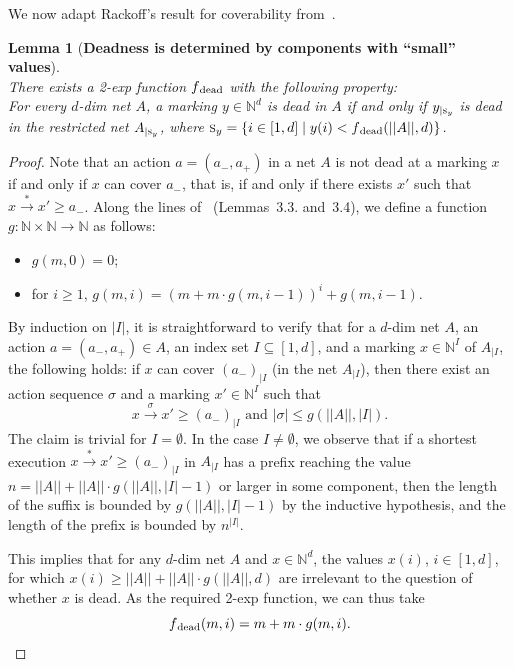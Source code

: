 \documentclass[11pt,a4paper]{amsart}
\newcommand{\step}[1]{\mathrel{\xrightarrow{#1}}}
\newcommand{\reach}{\step{*}}
\newcommand{\nnorm}[1]{||#1||}
\newcommand{\dead}{{}_\textnormal{dead}}
\newcommand{\Nat}{\mathbb{N}}
\newcommand{\restr}[1]{_{|{#1}}}
\newcommand{\setN}{\Nat}
\let\origtextsc\textsc
\renewcommand{\textsc}[1]{\textnormal{\origtextsc{#1}}}
\theoremstyle{plain}
\newtheorem{lem}[thm]{Lemma}
\theoremstyle{definition}
\theoremstyle{defC}
\theoremstyle{thmC}
\begin{document}
\noindent
We now adapt Rackoff's result for coverability
from~\cite{DBLP:journals/tcs/Rackoff78}.
\begin{lem}[\textbf{Deadness is determined by components with
	``small'' values}]\label{lem:rackoffdead}
\hfill\\
	There exists a 2-exp function $f\dead$ with the following property:
\\
For every
$d$-dim net $A$, a marking $y\in\setN^d$ is dead in $A$ if and only if 
 $y\restr{\textsc{s}_y}$ is dead in the restricted net
	$A\restr{\textsc{s}_y}$,
	where $\textsc{s}_y=\{i\in [1,d]\mid
y(i)<f\dead(\nnorm{A},d)\}$.
\end{lem}
\begin{proof}
Note that an action $a=(a_-,a_+)$ in a net $A$
	is not dead
	at a marking $x$ if and only if $x$ can cover $a_-$, that is, 
	if and only if there exists $x'$ such that $x\reach x'\geq a_-$.
	Along the lines of~\cite{DBLP:journals/tcs/Rackoff78}
	(Lemmas~3.3. and~3.4), we define a function
	$g:\setN\times\setN\to\setN$ as follows:
\begin{itemize}
	\item			
 $g(m,0)=0$;
\item
	for $i\geq 1$,	$g(m,i)= (m + m\cdot g(m,i{-}1))^{i}+g(m,i{-}1)$.
\end{itemize}		

	\noindent
	By induction on $|I|$, it is straightforward to verify that 
	for a $d$-dim net $A$, 
an action $a=(a_-,a_+)\in A$, an index set $I\subseteq [1,d]$, and a
	marking
	$x\in\setN^I$ of $A\restr{I}$, the following holds: if  $x$ can cover
	$(a_-)\restr{I}$ (in the net $A\restr{I}$), then 
there exist an action sequence $\sigma$ and a marking $x'\in\setN^I$ such that 
	\begin{equation*}
		x\step{\sigma}x'\geq (a_-)\restr{I}\text{ and }|\sigma|\leq
	g(\nnorm{A},|I|). 
	\end{equation*}
The claim is trivial for $I=\emptyset$.	In the case $I\neq\emptyset$,
we observe that 
if a shortest execution  $x\reach x'\geq (a_-)\restr{I}$ in
	$A\restr{I}$
	 has a prefix
	reaching the value $n=\nnorm{A} + \nnorm{A}\cdot
	g(\nnorm{A},|I|{-}1)$ or larger in some
	component, then the length of the suffix is bounded
	by $g(\nnorm{A},|I|{-}1)$ by the inductive hypothesis, and the
	length of the prefix is bounded by $n^{|I|}$.

This implies that for any $d$-dim net $A$ and $x\in\setN^d$, 
the values
	$x(i)$, $i\in[1,d]$, for which  
	$x(i)\geq \nnorm{A}+\nnorm{A}\cdot g(\nnorm{A},d)$ are
	irrelevant to 
	the question of whether $x$ is dead. 
As the required 2-exp function, we can thus take
	\[f\dead(m,i)=m+m\cdot g(m,i).\qedhere\] 
\end{proof}	
\end{document}

